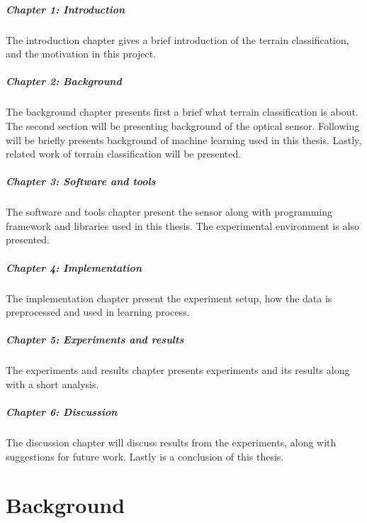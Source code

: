 \documentclass[USenglish]{ifimaster}  %
\begin{document}
\paragraph{Chapter 1: Introduction}
The introduction chapter gives a brief introduction of the terrain classification, and the motivation in this project.
	
\paragraph{Chapter 2: Background}
The background chapter presents first a brief what terrain classification is about. The second section will be presenting background of the optical sensor. Following will be briefly presents background of machine learning used in this thesis. Lastly, related work of terrain classification will be presented.

\paragraph{Chapter 3: Software and tools}
The software and tools chapter present the sensor along with programming framework and libraries used in this thesis. The experimental environment is also presented. 
	
\paragraph{Chapter 4: Implementation}
The implementation chapter present the experiment setup, how the data is preprocessed and used in learning process.
	
\paragraph{Chapter 5: Experiments and results}
The experiments and results chapter presents experiments and its results along with a short analysis.
	
\paragraph{Chapter 6: Discussion}
The discussion chapter will discuss results from the experiments, along with suggestions for future work. Lastly is a conclusion of this thesis. 
	
	
\chapter{Background}                  %
\end{document}
